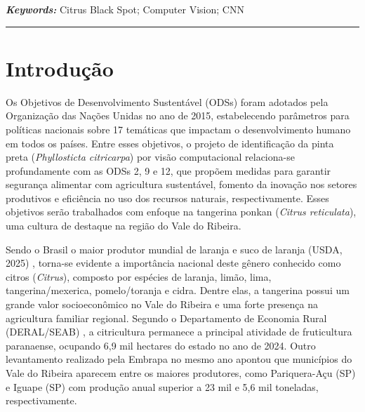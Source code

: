 \documentclass[11pt,a4paper]{article}
\begin{document}
\vspace{0.3cm}
\noindent\textit{\textbf{Keywords:}} Citrus Black Spot; Computer Vision; CNN

\vspace{0.5cm}
\noindent\rule{\textwidth}{0.5pt}
\vspace{0.5cm}

\section{Introdução}



Os Objetivos de Desenvolvimento Sustentável (ODSs) foram adotados pela Organização das Nações Unidas \cite{ONU2025} no ano de 2015, estabelecendo parâmetros para políticas nacionais sobre 17 temáticas que impactam o desenvolvimento humano em todos os países. Entre esses objetivos, o projeto de identificação da pinta preta (\emph{Phyllosticta citricarpa}) por visão computacional relaciona-se profundamente com as ODSs 2, 9 e 12, que propõem medidas para garantir segurança alimentar com agricultura sustentável, fomento da inovação nos setores produtivos e eficiência no uso dos recursos naturais, respectivamente. Esses objetivos serão trabalhados com enfoque na tangerina ponkan (\emph{Citrus reticulata}), uma cultura de destaque na região do Vale do Ribeira.

Sendo o Brasil o maior produtor mundial de laranja e suco de laranja (USDA, 2025) \cite{USDA2025}, torna-se evidente a importância nacional deste gênero conhecido como citros (\emph{Citrus}), composto por espécies de laranja, limão, lima, tangerina/mexerica, pomelo/toranja e cidra. Dentre elas, a tangerina possui um grande valor socioeconômico no Vale do Ribeira e uma forte presença na agricultura familiar regional. Segundo o Departamento de Economia Rural (DERAL/SEAB) \cite{DERAL2024}, a citricultura permanece a principal atividade de fruticultura paranaense, ocupando 6,9 mil hectares do estado no ano de 2024. Outro levantamento realizado pela Embrapa \cite{Embrapa2024} no mesmo ano apontou que municípios do Vale do Ribeira aparecem entre os maiores produtores, como Pariquera-Açu (SP) e Iguape (SP) com produção anual superior a 23 mil e 5,6 mil toneladas, respectivamente.
\end{document}
